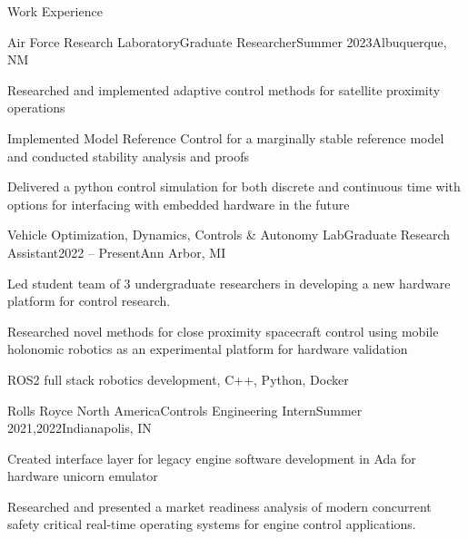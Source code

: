 \documentclass[]{jheidegger-resume}
\begin{document}
\begin{section}{Work Experience}
    \begin{subsection}{Air Force Research Laboratory}{Graduate Researcher}{Summer 2023}{Albuquerque, NM}
        \item Researched and implemented adaptive control methods for satellite proximity operations
        \item Implemented Model Reference Control for a marginally stable reference model and conducted stability analysis and proofs
        \item Delivered a python control simulation for both discrete and continuous time with options for interfacing with embedded hardware in the future
    \end{subsection}
    \begin{subsection}{Vehicle Optimization, Dynamics, Controls \& Autonomy Lab}{Graduate Research Assistant}{2022 -- Present}{Ann Arbor, MI}
        \item Led student team of 3 undergraduate researchers in developing a new hardware platform for control research.
        \item Researched novel methods for close proximity spacecraft control using mobile holonomic robotics as an experimental platform for hardware validation
        \item ROS2 full stack robotics development, C++, Python, Docker
    \end{subsection}
    
    \begin{subsection}{Rolls Royce North America}{Controls Engineering Intern}{Summer 2021,2022}{Indianapolis, IN}
        \item Created interface layer for legacy engine software development in Ada for hardware unicorn emulator
        \item Researched and presented a market readiness analysis of modern concurrent safety critical real-time operating systems for engine control applications. 
    \end{subsection}
    
\end{section}
\end{document}

